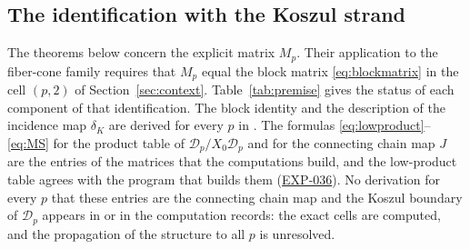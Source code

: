 \documentclass[11pt]{article}
\theoremstyle{definition}
\theoremstyle{remark}
\newcommand{\Exp}[2]{\href{https://github.com/fsantibanezleal/CAOS_RESEARCH/tree/main/problems/commutative-algebra/huneke-wiegand/experiments/#1}{#2}}
\begin{document}
\subsection{The identification with the Koszul strand}\label{sec:premise}

The theorems below concern the explicit matrix $M_p$. Their application to the
fiber-cone family requires that $M_p$ equal the block matrix \eqref{eq:blockmatrix}
in the cell $(p,2)$ of Section~\ref{sec:context}. Table~\ref{tab:premise} gives
the status of each component of that identification. The block identity and the
description of the incidence map $\delta_K$ are derived for every $p$ in
\cite{CAOSMain}. The formulas \eqref{eq:lowproduct}--\eqref{eq:MS} for the
product table of $\mathcal D_p/X_0\mathcal D_p$ and for the connecting chain map
$J$ are the entries of the matrices that the computations build, and the
low-product table agrees with the program that builds them
(\Exp{EXP-036-factor-two-torsion-anatomy}{EXP-036}). No derivation for every $p$
that these entries are the connecting chain map and the Koszul boundary of
$\mathcal D_p$ appears in \cite{CAOSMain} or in the computation records:
the exact cells are computed, and the propagation of the structure to all $p$ is
unresolved.
\end{document}
